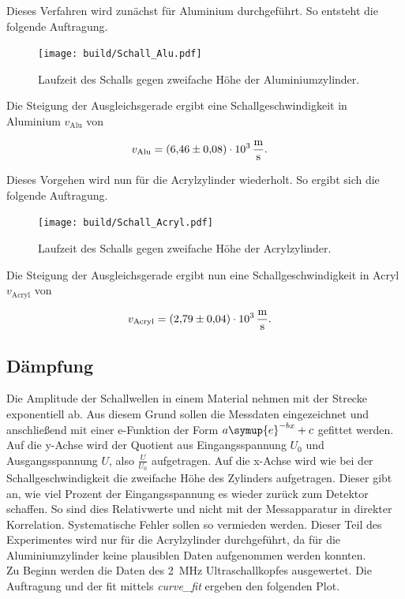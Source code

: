 \noindent Dieses Verfahren wird zunächst für Aluminium durchgeführt. So entsteht die folgende Auftragung.

\begin{figure}[H]
    \centering
    \texttt{[image: build/Schall\_Alu.pdf]}
    \caption{Laufzeit des Schalls gegen zweifache Höhe der Aluminiumzylinder.}
\end{figure}

\noindent Die Steigung der Ausgleichsgerade ergibt eine Schallgeschwindigkeit in Aluminium $v_\text{Alu}$ von 

\begin{align*}
    v_\text{Alu} &= \qty{6.46\pm0.08e3}{\meter \per \second}.
\end{align*}

\noindent Dieses Vorgehen wird nun für die Acrylzylinder wiederholt. So ergibt sich die folgende Auftragung.

\begin{figure}[H]
    \centering
    \texttt{[image: build/Schall\_Acryl.pdf]}
    \caption{Laufzeit des Schalls gegen zweifache Höhe der Acrylzylinder.}
\end{figure}

\noindent Die Steigung der Ausgleichsgerade ergibt nun eine Schallgeschwindigkeit in Acryl $v_\text{Acryl}$ von 

\begin{align*}
    v_\text{Acryl} &= \qty{2.79\pm0.04e3}{\meter \per \second}.
\end{align*}


\subsection{Dämpfung}
Die Amplitude der Schallwellen in einem Material nehmen mit der Strecke exponentiell ab. Aus diesem Grund 
sollen die Messdaten eingezeichnet und anschließend mit einer e-Funktion der Form $a \symup{e} ^{-bx} +c$ 
gefittet werden. Auf die y-Achse wird der Quotient aus Eingangsspannung $U_0$ und Ausgangsspannung $U$, 
also $\frac{U}{U_0}$ aufgetragen. Auf die x-Achse wird wie bei der Schallgeschwindigkeit die zweifache Höhe 
des Zylinders aufgetragen. 
Dieser gibt an, wie viel Prozent der Eingangsspannung es wieder zurück zum Detektor schaffen. So sind dies 
Relativwerte und nicht mit der Messapparatur in direkter Korrelation. Systematische Fehler sollen so vermieden 
werden. Dieser Teil des Experimentes wird nur für die Acrylzylinder durchgeführt, da für die Aluminiumzylinder 
keine plausiblen Daten aufgenommen werden konnten. \\
\noindent Zu Beginn werden die Daten des \qty{2}{\mega \hertz} Ultraschallkopfes ausgewertet. Die Auftragung 
und der fit mittels \emph{curve\_fit} ergeben den folgenden Plot.

